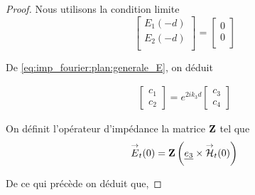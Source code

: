         \begin{proof}
            Nous utilisons la condition limite 
            \begin{equation}
                \begin{bmatrix}
                    E_1(-d)\\
                    E_2(-d)\\
                \end{bmatrix}
                =
                \begin{bmatrix}
                    0\\
                    0\\
                \end{bmatrix}
            \end{equation}

            De \eqref{eq:imp_fourier:plan:generale_E}, on déduit

            \begin{align}
                \begin{bmatrix}
                    c_1 \\
                    c_2
                \end{bmatrix}
                = e^{2ik_3 d}
                \begin{bmatrix}
                    c_3 \\
                    c_4
                \end{bmatrix}
            \end{align}

            On définit l'opérateur d'impédance la matrice $\mathbf{Z}$ tel que 
            \begin{equation}
                {\overset{\rightarrow}{E}}_t(0) = \mathbf{Z} \left(\underline{e_3} \times {\overset{\rightarrow}{\mathcal{H}}}_t(0)\right)
            \end{equation}

            De ce qui précède on déduit que,


\end{proof}
